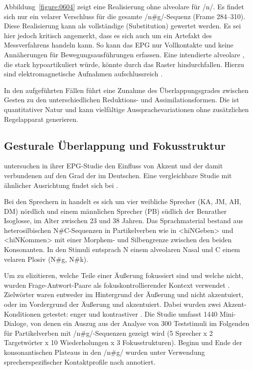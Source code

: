\largerpage
Abbildung~\ref{figure:0604} zeigt eine Realisierung ohne alveolare  für /n/. Es findet sich nur ein velarer Verschluss für die gesamte /n\#g/-Sequenz (Frame 284--310). Diese Realisierung kann als vollständige  (Substitution) gewertet werden. Es sei hier jedoch kritisch angemerkt, dass es sich auch um ein Artefakt des Messverfahrens handeln kann. So kann das EPG nur Vollkontakte und keine Annäherungen für Bewegungsausführungen erfassen. Eine intendierte alveolare , die stark hypoartikuliert würde, könnte durch das Raster hindurchfallen. Hierzu sind elektromagnetische Aufnahmen aufschlussreich \citep{Jaeger2007}.




In den aufgeführten Fällen führt eine Zunahme des Überlappungsgrades zwischen Gesten zu den unterschiedlichen Reduktions- und Assimilationsformen. Die  ist quantitativer Natur und kann vielfältige Aussprachevariationen ohne zusätzlichen Regelapparat generieren.

\subsection{Gesturale Überlappung und Fokusstruktur}
\label{subsec:060202}

\citet{Mücke2008c} untersuchen in ihrer EPG-Studie den Einfluss von Akzent und der damit verbundenen  auf den Grad der  im Deutschen. Eine vergleichbare Studie mit ähnlicher Ausrichtung findet sich bei \citet{Bergmann2012}.

Bei den Sprechern in \citet{Mücke2008c} handelt es sich um vier weibliche Sprecher (KA, JM, AH, DM) nördlich und einem männlichen Sprecher (PB) südlich der Benrather Isoglosse, im Alter zwischen 23 und 38 Jahren. Das Sprachmaterial bestand aus heterosilbischen N\#C-Sequenzen in Partikelverben wie in <hiNGeben> und <hiNKommen> mit einer Morphem- und Silbengrenze zwischen den beiden Konsonanten. In den Stimuli entsprach N einem alveolaren Nasal und C einem velaren Plosiv (N\#g, N\#k).

Um zu elizitieren, welche Teile einer Äußerung fokussiert sind und welche nicht, wurden Frage-Antwort-Paare als fokuskontrollierender Kontext verwendet \citep[vgl.][]{Uhmann1991, Wagner2012, Krifka2008, Culicover1983, Büring2003}. Zielwörter waren entweder im Hintergrund der Äußerung und nicht akzentuiert, oder im Vordergrund der Äußerung und akzentuiert. Dabei wurden zwei Akzent-Konditionen getestet: enger  und kontrastiver . Die Studie umfasst 1440 Mini-Dialoge, von denen ein Auszug aus der Analyse von 300 Teststimuli im Folgenden für Partikelverben mit /n\#g/-Sequenzen gezeigt wird (5 Sprecher x 2 Targetwörter x 10 Wiederholungen x 3 Fokusstrukturen). Beginn und Ende der konsonantischen Plateaus in den /n\#g/ wurden unter Verwendung sprecherspezifischer Kontaktprofile nach \citet{Byrd1996b} annotiert.

